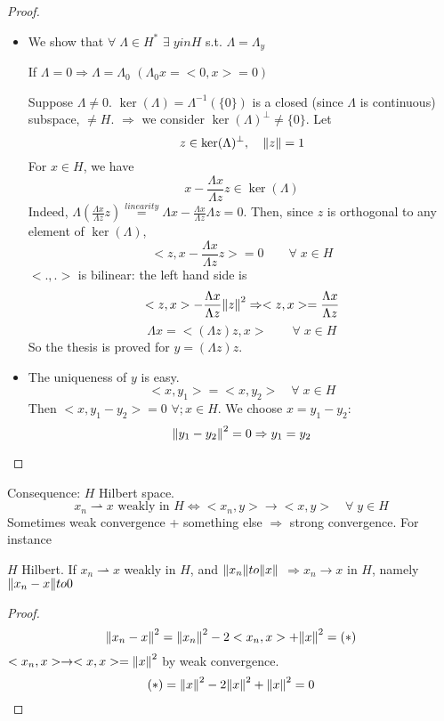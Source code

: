 \begin{proof}
    \begin{itemize}
        \item We show that \(\forall\; \Lambda \in H^* \) \(\exists\; y in H\) s.t. \(\Lambda = \Lambda_y\)
        
        If \(\Lambda = 0 \Rightarrow \Lambda = \Lambda_0\) \((\Lambda_0 x = <0, x> = 0)\)

        Suppose \(\Lambda \neq 0. \) \(\ker(\Lambda) = \Lambda^{-1}(\{0\}) \) is a closed (since \(\Lambda\) is continuous) subspace, \(\neq H\). \(\Rightarrow\) we consider \(\ker(\Lambda)^\perp \neq \{0\}\). Let
        \[
            z \in \ker(\Lambda)^\perp, \quad \norm{z}=1
        \]
        For \(x \in H\), we have
        \[
            x - \frac{\Lambda x}{\Lambda z} z \in \ker(\Lambda)
        \]
        Indeed, \(\Lambda \left( \frac{\Lambda x}{\Lambda z} z \right) \overset{linearity}{=} \Lambda x - \frac{\Lambda x}{\Lambda z} \Lambda z = 0\). Then, since \(z\) is orthogonal to any element of \(\ker(\Lambda)\), 
        \[
            <z, x - \frac{\Lambda x}{\Lambda z} z> = 0 \qquad \forall\; x \in H
        \] 
        \(<.,.>\) is bilinear: the left hand side is 
        \[
            <z, x> - \frac{\Lambda x}{\Lambda z} \norm{z}^2 \Rightarrow <z, x> = \frac{\Lambda x}{\Lambda z} 
        \]
        \[
            \Lambda x = <(\Lambda z)z, x> \qquad \forall \; x \in H
        \]
        So the thesis is proved for \(y = (\Lambda z)z\).

        \item The uniqueness of \(y\) is easy.
        \[
            <x, y_1> = <x, y_2> \quad \forall \; x \in H
        \]
        Then \(<x, y_1-y_2> = 0\) \(\forall; x \in H\). We choose \(x = y_1 -y_2\):
        \[
            \norm{y_1 - y_2}^2 = 0 \Rightarrow y_1 = y_2
        \]
    \end{itemize}
\end{proof}

Consequence: \(H\) Hilbert space.
\[
    x_n \rightharpoonup x \text{ weakly in } H \iff <x_n, y> \to <x, y> \quad \forall\; y \in H
\]
Sometimes weak convergence + something else \(\Rightarrow\) strong convergence. For instance
\begin{proposition}
    \(H\) Hilbert. If \(x_n \rightharpoonup x\) weakly in \(H\), and \(\norm{x_n} to \norm{x}\) \(\Rightarrow x_n \to x\) in \(H\), namely \(\norm{x_n - x} to 0\)
\end{proposition}
\begin{proof}
    \[
        \norm{x_n - x }^2 = \norm{x_n}^2 - 2 <x_n, x> + \norm{x}^2 = (*)
    \]
    \(<x_n, x> \to <x, x> = \norm{x}^2 \) by weak convergence.
    \[
        (*) = \norm{x}^2 - 2 \norm{x}^2 + \norm{x}^2 = 0
    \]
\end{proof}

